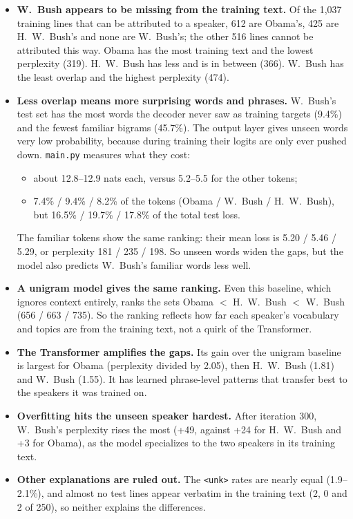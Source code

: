 \documentclass[11pt]{article}
\newcommand{\code}[1]{\texttt{#1}}
\begin{document}
\begin{itemize}
  \item \textbf{W.\ Bush appears to be missing from the training text.} Of the 1{,}037 training lines that can be attributed to a speaker, 612 are Obama's, 425 are H.\ W.\ Bush's and none are W.\ Bush's; the other 516 lines cannot be attributed this way. Obama has the most training text and the lowest perplexity (319). H.\ W.\ Bush has less and is in between (366). W.\ Bush has the least overlap and the highest perplexity (474).
  \item \textbf{Less overlap means more surprising words and phrases.} W.\ Bush's test set has the most words the decoder never saw as training targets (9.4\%) and the fewest familiar bigrams (45.7\%). The output layer gives unseen words very low probability, because during training their logits are only ever pushed down. \code{main.py} measures what they cost:
  \begin{itemize}
    \item about 12.8--12.9 nats each, versus 5.2--5.5 for the other tokens;
    \item 7.4\% / 9.4\% / 8.2\% of the tokens (Obama / W.\ Bush / H.\ W.\ Bush), but 16.5\% / 19.7\% / 17.8\% of the total test loss.
  \end{itemize}
  The familiar tokens show the same ranking: their mean loss is 5.20 / 5.46 / 5.29, or perplexity 181 / 235 / 198. So unseen words widen the gaps, but the model also predicts W.\ Bush's familiar words less well.
  \item \textbf{A unigram model gives the same ranking.} Even this baseline, which ignores context entirely, ranks the sets Obama $<$ H.\ W.\ Bush $<$ W.\ Bush (656 / 663 / 735). So the ranking reflects how far each speaker's vocabulary and topics are from the training text, not a quirk of the Transformer.
  \item \textbf{The Transformer amplifies the gaps.} Its gain over the unigram baseline is largest for Obama (perplexity divided by 2.05), then H.\ W.\ Bush (1.81) and W.\ Bush (1.55). It has learned phrase-level patterns that transfer best to the speakers it was trained on.
  \item \textbf{Overfitting hits the unseen speaker hardest.} After iteration 300, W.\ Bush's perplexity rises the most (+49, against +24 for H.\ W.\ Bush and +3 for Obama), as the model specializes to the two speakers in its training text.
  \item \textbf{Other explanations are ruled out.} The \code{<unk>} rates are nearly equal (1.9--2.1\%), and almost no test lines appear verbatim in the training text (2, 0 and 2 of 250), so neither explains the differences.
\end{itemize}
\end{document}
